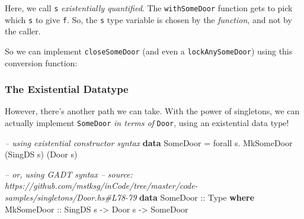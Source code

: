 \documentclass[]{article}
\newenvironment{Shaded}{}{}
\newcommand{\KeywordTok}[1]{\textcolor[rgb]{0.00,0.44,0.13}{\textbf{#1}}}
\newcommand{\DataTypeTok}[1]{\textcolor[rgb]{0.56,0.13,0.00}{#1}}
\newcommand{\CharTok}[1]{\textcolor[rgb]{0.25,0.44,0.63}{#1}}
\newcommand{\CommentTok}[1]{\textcolor[rgb]{0.38,0.63,0.69}{\textit{#1}}}
\newcommand{\OtherTok}[1]{\textcolor[rgb]{0.00,0.44,0.13}{#1}}
\newcommand{\FunctionTok}[1]{\textcolor[rgb]{0.02,0.16,0.49}{#1}}
\newcommand{\NormalTok}[1]{#1}
\begin{document}
Here, we call \texttt{s} \emph{existentially quantified}. The
\texttt{withSomeDoor} function gets to pick which \texttt{s} to give \texttt{f}.
So, the \texttt{s} type variable is chosen by the \emph{function}, and not by
the caller.

So we can implement \texttt{closeSomeDoor} (and even a \texttt{lockAnySomeDoor})
using this conversion function:

\begin{Shaded}
\end{Shaded}

\subsubsection{The Existential Datatype}\label{the-existential-datatype}

However, there's another path we can take. With the power of singletons, we can
actually implement \texttt{SomeDoor} \emph{in terms of} \texttt{Door}, using an
existential data type!

\begin{Shaded}
\begin{Highlighting}[]
\CommentTok{-- using existential constructor syntax}
\KeywordTok{data} \DataTypeTok{SomeDoor} \FunctionTok{=}\NormalTok{ forall s}\FunctionTok{.} \DataTypeTok{MkSomeDoor}\NormalTok{ (}\DataTypeTok{SingDS}\NormalTok{ s) (}\DataTypeTok{Door}\NormalTok{ s)}

\CommentTok{-- or, using GADT syntax}
\CommentTok{-- source: https://github.com/mstksg/inCode/tree/master/code-samples/singletons/Door.hs#L78-79}
\KeywordTok{data} \DataTypeTok{SomeDoor}\OtherTok{ ::} \DataTypeTok{Type} \KeywordTok{where}
    \DataTypeTok{MkSomeDoor}\OtherTok{ ::} \DataTypeTok{SingDS}\NormalTok{ s }\OtherTok{->} \DataTypeTok{Door}\NormalTok{ s }\OtherTok{->} \DataTypeTok{SomeDoor}
\end{Highlighting}
\end{Shaded}
\end{document}
